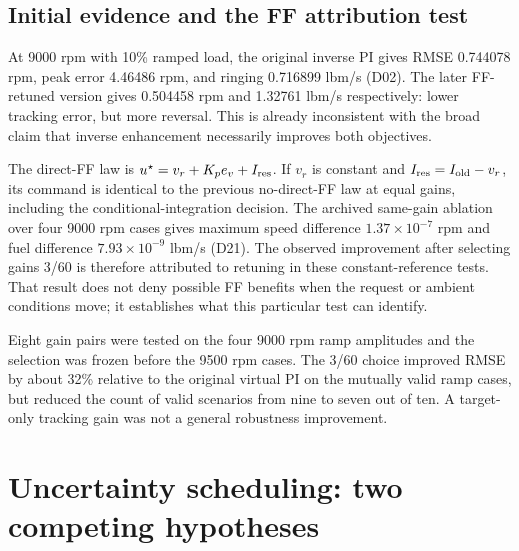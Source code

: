 \documentclass[11pt,a4paper,oneside]{report}
\begin{document}
\section{Initial evidence and the FF attribution test}
At 9000 rpm with 10\% ramped load, the original inverse PI gives RMSE 0.744078 rpm, peak error 4.46486 rpm, and ringing 0.716899 lbm/s (D02). The later FF-retuned version gives 0.504458 rpm and 1.32761 lbm/s respectively: lower tracking error, but more reversal. This is already inconsistent with the broad claim that inverse enhancement necessarily improves both objectives.

The direct-FF law is $u^\star=v_r+K_pe_v+I_{\rm res}$. If $v_r$ is constant and $I_{\rm res}=I_{\rm old}-v_r$, its command is identical to the previous no-direct-FF law at equal gains, including the conditional-integration decision. The archived same-gain ablation over four 9000 rpm cases gives maximum speed difference $1.37\times10^{-7}$ rpm and fuel difference $7.93\times10^{-9}$ lbm/s (D21). The observed improvement after selecting gains 3/60 is therefore attributed to retuning in these constant-reference tests. That result does not deny possible FF benefits when the request or ambient conditions move; it establishes what this particular test can identify.

Eight gain pairs were tested on the four 9000 rpm ramp amplitudes and the selection was frozen before the 9500 rpm cases. The 3/60 choice improved RMSE by about 32\% relative to the original virtual PI on the mutually valid ramp cases, but reduced the count of valid scenarios from nine to seven out of ten. A target-only tracking gain was not a general robustness improvement.

\chapter{Uncertainty scheduling: two competing hypotheses}
\end{document}
